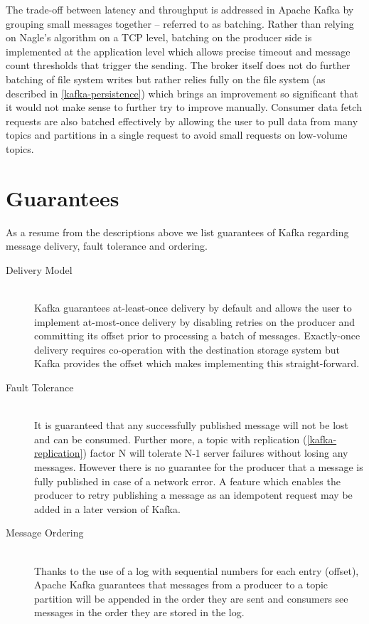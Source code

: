 The trade-off between latency and throughput is addressed in Apache Kafka by
grouping small messages together -- referred to as batching. Rather than relying
on Nagle's algorithm on a TCP level, batching on the producer side is implemented
at the application level which allows precise timeout and message count
thresholds that trigger the sending. The broker itself does not do further batching
of file system writes but rather relies fully on the file system (as described in
\ref{kafka-persistence}) which brings an improvement so significant that it would
not make sense to further try to improve manually. Consumer data fetch requests
are also batched effectively by allowing the user to pull data from many
topics and partitions in a single request to avoid small requests on low-volume
topics. \cite{goodhope2012building}


\section{Guarantees}
\label{kafka-guarantees}
As a resume from the descriptions above we list guarantees of Kafka regarding
message delivery, fault tolerance and ordering. 

\begin{description}

\item[Delivery Model] \hfill \\
    Kafka guarantees at-least-once delivery by default and allows the user to
    implement at-most-once delivery by disabling retries on the producer and
    committing its offset prior to processing a batch of messages. Exactly-once
    delivery requires co-operation with the destination storage system but Kafka
    provides the offset which makes implementing this
    straight-forward.\cite{apachekafka}

\item[Fault Tolerance] \hfill \\
    It is guaranteed that any successfully published message will not be lost
    and can be consumed. Further more, a topic with replication
    (\ref{kafka-replication}) factor N will tolerate N-1 server failures without
    losing any messages. However there is no guarantee for the producer that
    a message is fully published in case of a network error. A feature which
    enables the producer to retry publishing a message as an idempotent
    request may be added in a later version of Kafka. \cite{apachekafka}

\item[Message Ordering] \hfill \\
    Thanks to the use of a log with sequential numbers for each entry (offset),
    Apache Kafka guarantees that messages from a producer to a topic partition
    will be appended in the order they are sent and consumers see messages
    in the order they are stored in the log. \cite{apachekafka}

\end{description}

